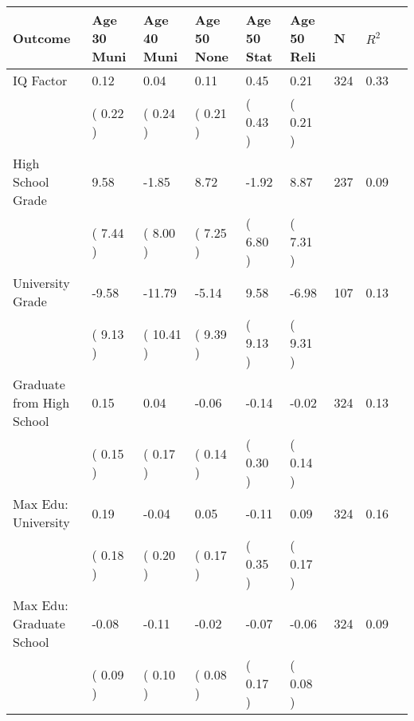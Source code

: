 \begin{tabular}{L{6.2cm} C{1.8cm} C{1.8cm} C{1.8cm} C{1.8cm} C{1.8cm} C{1.8cm} C{0.3cm} C{0.3cm}}
\toprule
 \textbf{Outcome} & \textbf{Age 30 Muni} & \textbf{Age 40 Muni} & \textbf{Age 50 None} & \textbf{Age 50 Stat} & \textbf{Age 50 Reli} & \textbf{N} & \textbf{$ R^2$} \\
\midrule
IQ Factor &      0.12 &      0.04 &      0.11 &      0.45 &      0.21  & 324 &       0.33 \\ 
 & (     0.22 ) & (     0.24 ) & (     0.21 ) & (     0.43 ) & (     0.21 )  & \\
High School Grade &      9.58 &     -1.85 &      8.72 &     -1.92 &      8.87  & 237 &       0.09 \\ 
 & (     7.44 ) & (     8.00 ) & (     7.25 ) & (     6.80 ) & (     7.31 )  & \\
University Grade &     -9.58 &    -11.79 &     -5.14 &      9.58 &     -6.98  & 107 &       0.13 \\ 
 & (     9.13 ) & (    10.41 ) & (     9.39 ) & (     9.13 ) & (     9.31 )  & \\
Graduate from High School &      0.15 &      0.04 &     -0.06 &     -0.14 &     -0.02  & 324 &       0.13 \\ 
 & (     0.15 ) & (     0.17 ) & (     0.14 ) & (     0.30 ) & (     0.14 )  & \\
Max Edu: University &      0.19 &     -0.04 &      0.05 &     -0.11 &      0.09  & 324 &       0.16 \\ 
 & (     0.18 ) & (     0.20 ) & (     0.17 ) & (     0.35 ) & (     0.17 )  & \\
Max Edu: Graduate School &     -0.08 &     -0.11 &     -0.02 &     -0.07 &     -0.06  & 324 &       0.09 \\ 
 & (     0.09 ) & (     0.10 ) & (     0.08 ) & (     0.17 ) & (     0.08 )  & \\
\bottomrule
\end{tabular}
